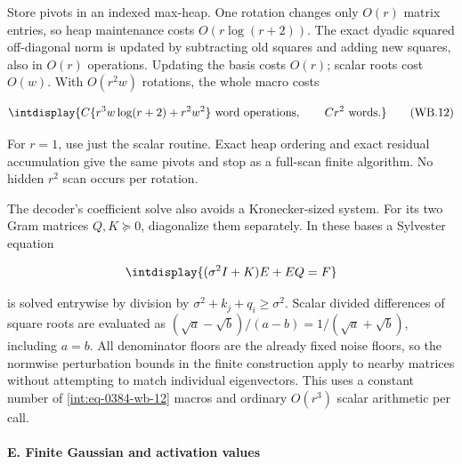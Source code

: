 
Store pivots in an indexed max-heap. One rotation changes only \(O(r)\) matrix entries, so heap maintenance costs \(O(r\log(r+2))\). The exact dyadic squared off-diagonal norm is updated by subtracting old squares and adding new squares, also in \(O(r)\) operations. Updating the basis costs \(O(r)\); scalar roots cost \(O(w)\). With \(O(r^2w)\) rotations, the whole macro costs


\begingroup\renewcommand{\theHequation}{intdisplay.793}
\begin{equation}
\intdisplay{
C\{r^3w\log(r+2)+r^2w^2\}\text{ word operations},
\qquad Cr^2\text{ words}.
}
\tag{WB.12}
\label{int:eq-0384-wb-12}
\end{equation}
\endgroup


For \(r=1\), use just the scalar routine. Exact heap ordering and exact residual accumulation give the same pivots and stop as a full-scan finite algorithm. No hidden \(r^2\) scan occurs per rotation.



The decoder's coefficient solve also avoids a Kronecker-sized system. For its two Gram matrices \(Q,\allowbreak K\succeq0\), diagonalize them separately. In these bases a Sylvester equation


\begingroup\renewcommand{\theHequation}{intdisplay.794}
\begin{equation*}
\intdisplay{
(\sigma^2I+K)E+EQ=F
}
\end{equation*}
\endgroup


is solved entrywise by division by \(\sigma^2+k_j+q_i\ge\sigma^2\). Scalar divided differences of square roots are evaluated as \((\sqrt a-\sqrt b)/(a-b)=1/(\sqrt a+\sqrt b)\), including \(a=b\). All denominator floors are the already fixed noise floors, so the normwise perturbation bounds in the finite construction apply to nearby matrices without attempting to match individual eigenvectors. This uses a constant number of \eqref{int:eq-0384-wb-12} macros and ordinary \(O(r^3)\) scalar arithmetic per call.


\paragraph{E. Finite Gaussian and activation values}

